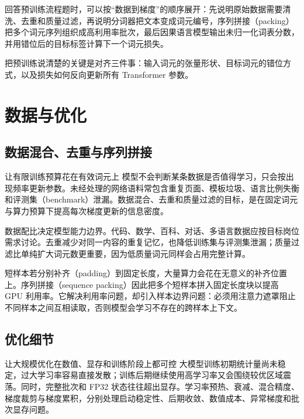 回答预训练流程题时，可以按“数据到梯度”的顺序展开：先说明原始数据需要清洗、去重和质量过滤，再说明分词器把文本变成词元编号，序列拼接（packing）把多个词元序列组织成高利用率批次，最后因果语言模型输出未归一化词表分数，并用错位后的目标标签计算下一个词元损失。

\begin{takeawaybox}
把预训练说清楚的关键是对齐三件事：输入词元的张量形状、目标词元的错位方式，以及损失如何反向更新所有 Transformer 参数。
\end{takeawaybox}

\chapter{数据与优化}\label{sec:optimization}

\section{数据混合、去重与序列拼接}

\begin{motivationbox}{让有限训练预算花在有效词元上}
模型不会判断某条数据是否值得学习，只会按出现频率更新参数。未经处理的网络语料常包含重复页面、模板垃圾、语言比例失衡和评测集（benchmark）泄漏。数据混合、去重和质量过滤的目标，是在固定词元与算力预算下提高每次梯度更新的信息密度。
\end{motivationbox}

数据配比决定模型能力边界。代码、数学、百科、对话、多语言数据应按目标岗位需求讨论。去重减少对同一内容的重复记忆，也降低训练集与评测集泄漏；质量过滤比单纯扩大词元数更重要，因为低质量词元同样会占用完整计算。

短样本若分别补齐（padding）到固定长度，大量算力会花在无意义的补齐位置上。序列拼接（sequence packing）因此把多个短样本拼入固定长度块以提高 GPU 利用率。它解决利用率问题，却引入样本边界问题：必须用注意力遮罩阻止不同样本之间互相读取，否则模型会学习不存在的跨样本上下文。

\section{优化细节}

\begin{motivationbox}{让大规模优化在数值、显存和训练阶段上都可控}
大模型训练初期统计量尚未稳定，过大学习率容易直接发散；训练后期继续使用高学习率又会围绕较优区域震荡。同时，完整批次和 FP32 状态往往超出显存。学习率预热、衰减、混合精度、梯度裁剪与梯度累积，分别处理启动稳定性、后期收敛、数值成本、异常梯度和批次显存问题。
\end{motivationbox}

